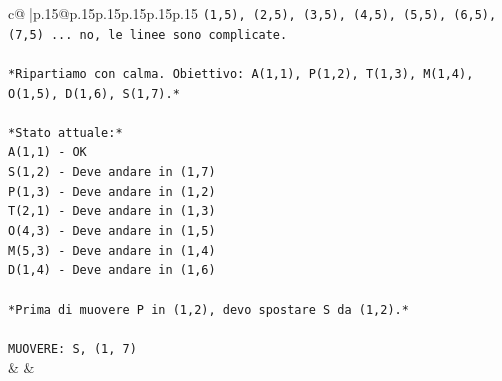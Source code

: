 \documentclass{article}
\begin{document}
{\begin{supertabular}{c@{$\;$}|p{.15\linewidth}@{}p{.15\linewidth}p{.15\linewidth}p{.15\linewidth}p{.15\linewidth}p{.15\linewidth}}
{{{\texttt{(1,5), (2,5), (3,5), (4,5), (5,5), (6,5), (7,5) ... no, le linee sono complicate.} \\
\\ 
\texttt{*Ripartiamo con calma. Obiettivo: A(1,1), P(1,2), T(1,3), M(1,4), O(1,5), D(1,6), S(1,7).*} \\
\\ 
\texttt{*Stato attuale:*} \\
\texttt{A(1,1) {-} OK} \\
\texttt{S(1,2) {-} Deve andare in (1,7)} \\
\texttt{P(1,3) {-} Deve andare in (1,2)} \\
\texttt{T(2,1) {-} Deve andare in (1,3)} \\
\texttt{O(4,3) {-} Deve andare in (1,5)} \\
\texttt{M(5,3) {-} Deve andare in (1,4)} \\
\texttt{D(1,4) {-} Deve andare in (1,6)} \\
\\ 
\texttt{*Prima di muovere P in (1,2), devo spostare S da (1,2).*} \\
\\ 
\texttt{MUOVERE: S, (1, 7)} \\
            }
        }
    }
    & & \\ \\


\end{supertabular}}
\end{document}
